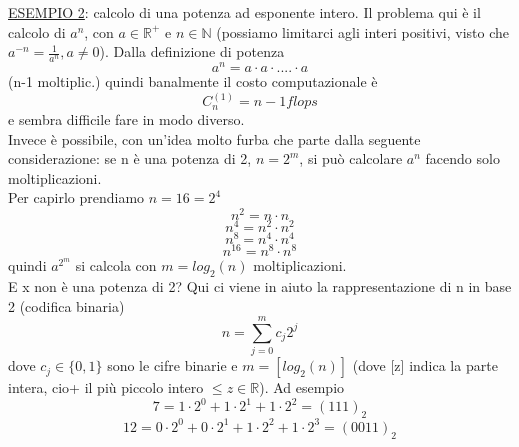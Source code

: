 \documentclass[12pt]{article}
\begin{document}
\underline{ESEMPIO 2}: calcolo di una potenza ad esponente intero. Il problema qui è il calcolo di $a^n$, con $a\in\mathbb{R}^+$ e $n\in \mathbb{N}$ (possiamo limitarci agli interi positivi, visto che $a^{-n}=\frac{1}{a^n}, a\neq0$). Dalla definizione di potenza
\begin{equation*}
    a^n=a\cdot a\cdot ....\cdot a  
\end{equation*}
(n-1 moltiplic.) quindi banalmente il costo computazionale è
\begin{equation*}
    C_{n}^{(1)}=n-1 flops
\end{equation*}
e sembra difficile fare in modo diverso.\\
Invece è possibile, con un'idea molto furba che parte dalla seguente considerazione: se n è una potenza di 2, $n=2^m$, si può calcolare $a^n$ facendo solo moltiplicazioni.\\Per capirlo prendiamo $n=16=2^4$
\begin{equation*}
    n^2=n\cdot n
    \end{equation*}
    \begin{equation*}
    n^4=n^2\cdot n^2
    \end{equation*}
    \begin{equation*}
    n^8=n^4\cdot n^4
    \end{equation*}
    \begin{equation*}
    n^{16}=n^8\cdot n^8
\end{equation*}
quindi $a^{2^{m}}$ si calcola con $m=log_2(n)$ moltiplicazioni.\\
E x non è una potenza di 2? Qui ci viene in aiuto la rappresentazione di n in base 2 (codifica binaria)
\begin{equation*}
    n=\sum_{j=0}^m c_j2^j
\end{equation*}
dove $c_j\in{\{0,1\}}$ sono le cifre binarie e $m=[log_2(n)]$ (dove [z] indica la parte intera, cio+ il più piccolo intero $\leq z\in\mathbb{R}$). Ad esempio
\begin{equation*}
    7=1\cdot 2^0+1\cdot 2^1+1\cdot 2^2=(111)_2
\end{equation*}
\begin{equation*}
    12=0\cdot 2^0+0\cdot 2^1+1\cdot 2^2+1\cdot 2^3=(0011)_2
\end{equation*}
\\
\end{document}
